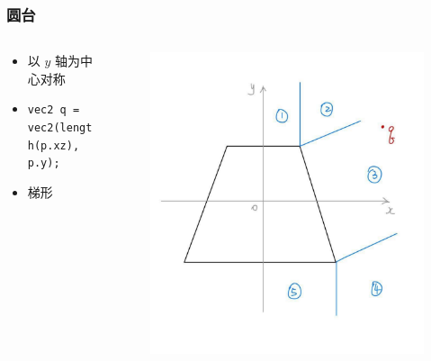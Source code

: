 \documentclass[aspectratio=169]{ctexbeamer} %
\begin{document}
\begin{frame}
    \frametitle{圆台} %
    \begin{columns}
        \begin{column}{.6\textwidth}
            \begin{itemize}
                \item 以 $y$ 轴为中心对称
                \item \texttt{vec2 q = vec2(length(p.xz), p.y);}
                \item 梯形
            \end{itemize}
        \end{column}
        \begin{column}{.4\textwidth}
            \begin{figure}[htbp]
                \centering
                \includegraphics[height=.65\textheight]{images/pre/cone_derive.pdf}
                \caption{}
                \label{fig:cone_derive}
            \end{figure}
        \end{column}
    \end{columns}
\end{frame}
\end{document}
